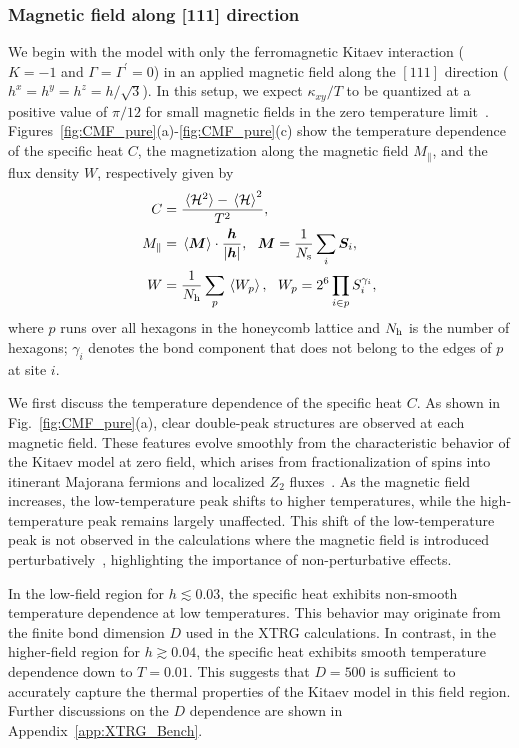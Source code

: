 \documentclass[twocolumn,superscriptaddress,showpacs, longbibliography, aps, prx]{revtex4-2}
\def\vec#1{\boldsymbol #1}
\begin{document}
\subsubsection{Magnetic field along [111] direction}\label{subsec:pureKitaev_h111}
We begin with the model with only the ferromagnetic Kitaev interaction ($K=-1$ and $\Gamma = \Gamma^\prime = 0$) in an applied magnetic field along the $[111]$ direction ($h^x=h^y=h^z=h/\sqrt{3}$). 
In this setup, we expect $\kappa_{xy}/T$ to be quantized at a positive value of $\pi/12$ for small magnetic fields in the zero temperature limit~\cite{Kitaev2006}. 
Figures~\ref{fig:CMF_pure}(a)-\ref{fig:CMF_pure}(c) show the temperature dependence of the specific heat $C$, the magnetization along the magnetic field $M_{\parallel}$, and the flux density $W$, respectively given by
\begin{align}
C&=\frac{\ev*{{\cal H}^{2}}-\ev*{{\cal H}}^2}{T^2}, \label{eq:C}\\
M_{\parallel}&=\ev*{\vec{M}}
\cdot\frac{\vec{h}}{|\vec{h}|},~~\vec{M}=\frac{1}{N_{\rm s}}\sum_{i}\vec{S}_{i}, \label{eq:Mag}\\
W&=\frac{1}{N_{\rm h}}\sum_{p}\ev*{W_{p}}, 
~~W_{p}=2^6\prod_{i\in p}S^{\gamma_{i}}_{i} \label{eq:W},
\end{align}
where $p$ runs over all hexagons in the honeycomb lattice and $N_{\rm h}$ is the number of hexagons; $\gamma_{i}$ denotes the bond component that does not belong to the edges of $p$ at site $i$.

We first discuss the temperature dependence of the specific heat $C$.
As shown in Fig.~\ref{fig:CMF_pure}(a), clear double-peak structures are observed at each magnetic field.
These features evolve smoothly from the characteristic behavior of the Kitaev model at zero field, which arises from fractionalization of spins into itinerant Majorana fermions and localized $Z_2$ fluxes~\cite{NasuUM2014,NasuUM2015}.
As the magnetic field increases, the low-temperature peak shifts to higher temperatures, while the high-temperature peak remains largely unaffected. 
This shift of the low-temperature peak is not observed in the calculations where the magnetic field is introduced perturbatively~\cite{NasuYM2017}, highlighting the importance of non-perturbative effects.

In the low-field region for $h\lesssim 0.03$, the specific heat exhibits non-smooth temperature dependence at low temperatures. 
This behavior may originate from the finite bond dimension $D$ used in the XTRG calculations. 
In contrast, in the higher-field region for $h \gtrsim 0.04$, the specific heat exhibits smooth temperature dependence down to $T=0.01$. 
This suggests that $D=500$ is sufficient to accurately capture the thermal properties of the Kitaev model in this field region. 
Further discussions on the $D$ dependence are shown in Appendix~\ref{app:XTRG_Bench}. 
\end{document}
